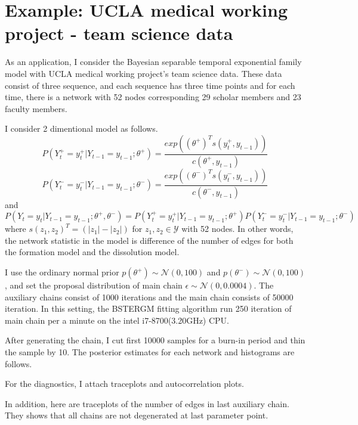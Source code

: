 \documentclass[aspectratio=169,ignorenonframetext,9pt]{beamer}
\theoremstyle{plain}
\theoremstyle{definition}
\begin{document}
\section{Example: UCLA medical working project - team science data}
As an application, I consider the Bayesian separable temporal exponential family model with UCLA medical working project's team science data.
These data consist of three sequence,
and each sequence has three time points and for each time,
there is a network with 52 nodes corresponding 29 scholar members and 23 faculty members.


I consider 2 dimentional model as follows.
\[P(Y_t^+=y_t^+|Y_{t-1}=y_{t-1};\theta^+) = \frac{exp((\theta^+)^{T}s(y_t^+, y_{t-1}))}{c(\theta^+, y_{t-1})}\]
\[P(Y_t^-=y_t^-|Y_{t-1}=y_{t-1};\theta^-) = \frac{exp((\theta^-)^{T}s(y_t^-, y_{t-1}))}{c(\theta^-, y_{t-1})}\]
and
\[P(Y_t=y_t|Y_{t-1}=y_{t-1};\theta^+,\theta^-)=P(Y_t^+=y_t^+|Y_{t-1}=y_{t-1};\theta^+) P(Y_t^-=y_t^-|Y_{t-1}=y_{t-1};\theta^-)\]
where
\(s(z_1,z_2)^T=(|z_1|-|z_2|)\)
for $z_1,z_2\in\mathcal{Y}$ with 52 nodes. In other words, the network statistic in the model is
difference of the number of edges for both the formation model and the dissolution model.

I use the ordinary normal prior $p(\theta^+)\sim\mathcal{N}(0,100)$ and $p(\theta^-)\sim\mathcal{N}(0,100)$,
and set the proposal distribution of main chain $\epsilon\sim\mathcal{N}(0,0.0004)$.
The auxiliary chains consist of 1000 iterations and the main chain consists of 50000 iteration.
In this setting, the BSTERGM fitting algorithm run 250 iteration of main chain per a minute on the intel i7-8700(3.20GHz) CPU.

After generating the chain, I cut first 10000 samples for a burn-in period and thin the sample by 10.
The posterior estimates for each network and histograms are follows.

For the diagnostics, I attach traceplots and autocorrelation plots.

In addition, here are traceplots of the number of edges in last auxiliary chain.
They shows that all chains are not degenerated at last parameter point.
\end{document}
